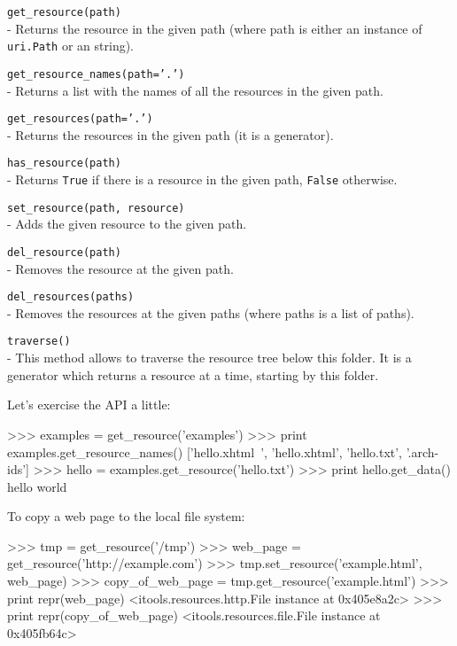 \begin{api}
  {\tt get\_resource(path)}\\
  - Returns the resource in the given path (where path is either an instance
    of {\tt uri.Path} or an string).

  {\tt get\_resource\_names(path='.')}\\
  - Returns a list with the names of all the resources in the given path.

  {\tt get\_resources(path='.')}\\
  - Returns the resources in the given path (it is a generator).

  {\tt has\_resource(path)}\\
  - Returns {\tt True} if there is a resource in the given path, {\tt False}
    otherwise.

  {\tt set\_resource(path, resource)}\\
  - Adds the given resource to the given path.

  {\tt del\_resource(path)}\\
  - Removes the resource at the given path.

  {\tt del\_resources(paths)}\\
  - Removes the resources at the given paths (where paths is a list of paths).

  {\tt traverse()}\\
  - This method allows to traverse the resource tree below this folder. It
    is a generator which returns a resource at a time, starting by this
    folder.
\end{api}

Let's exercise the API a little:

\begin{code}
    >>> examples = get_resource('examples')
    >>> print examples.get_resource_names()
    ['hello.xhtml~', 'hello.xhtml', 'hello.txt', '.arch-ids']
    >>> hello = examples.get_resource('hello.txt')
    >>> print hello.get_data()
    hello world
\end{code}

To copy a web page to the local file system:

\begin{code}
    >>> tmp = get_resource('/tmp')
    >>> web_page = get_resource('http://example.com')
    >>> tmp.set_resource('example.html', web_page)
    >>> copy_of_web_page = tmp.get_resource('example.html')
    >>> print repr(web_page)
    <itools.resources.http.File instance at 0x405e8a2c>
    >>> print repr(copy_of_web_page)
    <itools.resources.file.File instance at 0x405fb64c>
\end{code}

